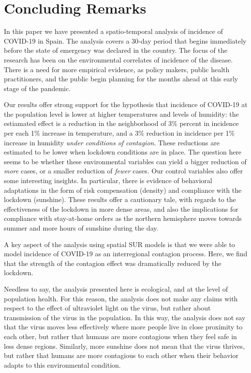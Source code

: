 \documentclass[]{elsarticle} %
\begin{document}
\hypertarget{conclusion}{%
\section{Concluding Remarks}\label{conclusion}}

In this paper we have presented a spatio-temporal analysis of incidence
of COVID-19 in Spain. The analysis covers a 30-day period that begins
immediately before the state of emergency was declared in the country.
The focus of the research has been on the environmental correlates of
incidence of the disease. There is a need for more empirical evidence,
as policy makers, public health practitioners, and the public begin
planning for the months ahead at this early stage of the pandemic.

Our results offer strong support for the hypothesis that incidence of
COVID-19 at the population level is lower at higher temperatures and
levels of humidity: the estiamated effect is a reduction in the
neighborhood of 3\% percent in incidence per each 1\% increase in
temperature, and a 3\% reduction in incidence per 1\% increase in
humidity \emph{under conditions of contagion}. These reductions are
estimated to be lower when lockdown conditions are in place. The
question here seems to be whether these environmental variables can
yield a bigger reduction of \emph{more} cases, or a smaller reduction of
\emph{fewer} cases. Our control variables also offer some interesting
insights. In particular, there is evidence of behavioral adaptations in
the form of risk compensation (density) and compliance with the lockdown
(sunshine). These results offer a cautionary tale, with regards to the
effectiveness of the lockdown in more dense areas, and also the
implications for compliance with stay-at-home orders as the northern
hemisphere moves towards summer and more hours of sunshine during the
day.

A key aspect of the analysis using spatial SUR models is that we were
able to model incidence of COVID-19 as an interregional contagion
process. Here, we find that the strength of the contagion effect was
dramatically reduced by the lockdown.

Needless to say, the analysis presented here is ecological, and at the
level of population health. For this reason, the analysis does not make
any claims with respect to the effect of ultraviolet light on the virus,
but rather about transmission of the virus in the population. In this
way, the analysis does not say that the virus moves less effectively
where more people live in close proximity to each other, but rather that
humans are more contagious when they feel safe in less dense regions.
Similarly, more sunshine does not mean that the virus thrives, but
rather that humans are more contagious to each other when their behavior
adapts to this environmental condition.
\end{document}
